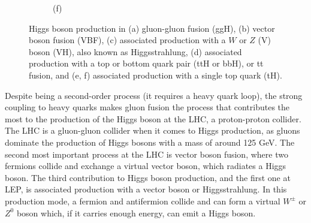 \begin{figure}[!ht]
\begin{subfigure}[t]{0.33\mylength}
            \setlength{\unitlength}{0.25\mylength}
            \caption{\footnotesize (f)}
    \end{subfigure}%
    \vspace*{-0.0cm}
    \caption{Higgs boson production in (a) gluon-gluon fusion (ggH), (b) vector boson fusion (VBF), (c) associated production with a $W$ or $Z$ (V) boson (VH), also known as Higgsstrahlung, (d) associated production with a top or bottom quark pair (ttH or bbH), or tt fusion, and (e, f) associated production with a single top quark (tH).}
    \label{fig:Higgs_production}
    \vspace*{-0.0cm}
\end{figure}

Despite being a second-order process (it requires a heavy quark loop), the strong coupling to heavy quarks makes gluon fusion the process that contributes the most to the production of the Higgs boson at the LHC, a proton-proton collider. The LHC is a gluon-gluon collider when it comes to Higgs production, as gluons dominate the production of Higgs bosons with a mass of around 125 GeV. The second most important process at the LHC is vector boson fusion, where two fermions collide and exchange a virtual vector boson, which radiates a Higgs boson. The third contribution to Higgs boson production, and the first one at LEP, is associated production with a vector boson or Higgsstrahlung. In this production mode, a fermion and antifermion collide and can form a virtual $W^{\pm}$ or $Z^0$ boson which, if it carries enough energy, can emit a Higgs boson.


